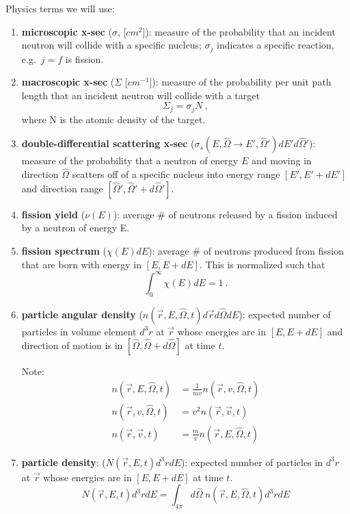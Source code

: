 \documentclass[12pt]{article}
\newcommand{\vOmega}{\ensuremath{\hat{\Omega}}}
\begin{document}
Physics terms we will use:
\begin{enumerate}
\item \textbf{microscopic x-sec} ($\sigma$, [$cm^2$]): measure of the probability that an incident neutron will collide with a specific nucleus; $\sigma_j$ indicates a specific reaction, e.g.\ $j=f$ is fission.

\item \textbf{macroscopic x-sec} ($\Sigma$ [$cm^{-1}$]): measure of the probability per unit path length that an incident neutron will collide with a target
\[\Sigma_j = \sigma_j N\:,\]
where N is the atomic density of the target.

\item \textbf{double-differential scattering x-sec} ($\sigma_s(E, \vOmega \rightarrow E', \vOmega')dE' d\vOmega'$): measure of the probability that a neutron of energy $E$ and moving in direction $\vOmega$ scatters off of a specific nucleus into energy range $[E', E' + dE']$ and direction range $[\vOmega', \vOmega' + d\vOmega']$.

\item \textbf{fission yield} ($\nu(E)$): average \# of neutrons released by a fission induced by a neutron of energy E.

\item \textbf{fission spectrum} ($\chi(E)dE$): average \# of neutrons produced from fission that are born with energy in $[E, E + dE]$. This is normalized such that
\[\int_0^{\infty} \chi(E)dE =1\:.\]

\item \textbf{particle angular density} ($n(\vec{r}, E, \vOmega, t)d\vec{r} d\vOmega dE$): expected number of particles in volume element $d^3r$ at $\vec{r}$ whose energies are in $[E, E + dE]$ and direction of motion is in $[\vOmega, \vOmega + d\vOmega]$ at time $t$.

Note:
\begin{align*}
n(\vec{r}, E, \vOmega, t) &= \frac{1}{mv}n(\vec{r}, v, \vOmega, t) \\
n(\vec{r}, v, \vOmega, t) &= v^2 n(\vec{r}, \vec{v}, t) \\
n(\vec{r}, \vec{v}, t) &= \frac{m}{v}n(\vec{r}, E, \vOmega, t)
\end{align*}

\item \textbf{particle density}: ($N(\vec{r},E,t)d^3r dE$): expected number of particles in $d^3r$ at $\vec{r}$ whose energies are in $[E, E + dE]$ at time $t$.
\[N(\vec{r},E,t)d^3r dE = \int_{4\pi} d\vOmega\: n(\vec{r}, E, \vOmega, t)d^3r dE \]


\end{enumerate}
\end{document}

